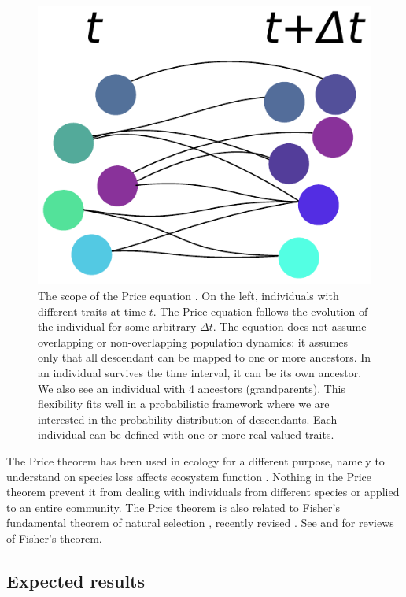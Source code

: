 \documentclass[letterpaper,12pt]{article}
\begin{document}
\begin{figure}[h!]
  \centering\includegraphics[width=1.0\textwidth]{price.pdf}

  \caption{The scope of the Price equation \cite{fra12}. On the left,
  individuals with different traits at time $t$. The Price equation follows
  the evolution of the individual for some arbitrary $\Delta t$. The
  equation does not assume overlapping or non-overlapping population
  dynamics: it assumes only that all descendant can be mapped to one or more
  ancestors. In an individual survives the time interval, it can be its own
  ancestor. We also see an individual with 4 ancestors (grandparents). This
  flexibility fits well in a probabilistic framework \cite{ric08} where
  we are interested in the probability distribution of descendants. Each individual
  can be defined with one or more real-valued traits.}

  \label{fig:price}
\end{figure}

The Price theorem has been used in ecology for a different purpose, namely
to understand on species loss affects ecosystem function \cite{fox06,fox08}.
Nothing in the Price theorem prevent it from dealing with individuals from
different species or applied to an entire community. The Price theorem is
also related to Fisher's fundamental theorem of natural selection \cite
{fis30,fis58}, recently revised \cite{les97}. See \cite{oka08} and \cite
{ewe04} for reviews of Fisher's theorem.

\subsection{Expected results}
\end{document}

